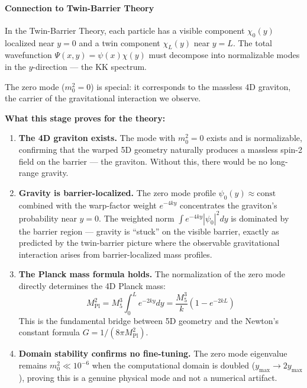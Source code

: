 \documentclass[
  11pt,
]{article}
\begin{document}
\bigskip

\hypertarget{connection-to-twin-barrier-theory-2}{%
\paragraph{Connection to Twin-Barrier
Theory}\label{connection-to-twin-barrier-theory-2}}

In the Twin-Barrier Theory, each particle has a visible component
\(\chi_0(y)\) localized near \(y = 0\) and a twin component
\(\chi_L(y)\) near \(y = L\). The total wavefunction
\(\Psi(x,y) = \psi(x)\chi(y)\) must decompose into normalizable modes in
the \(y\)-direction --- the KK spectrum.

The zero mode (\(m_0^2 = 0\)) is special: it corresponds to the massless
4D graviton, the carrier of the gravitational interaction we observe.

\textbf{What this stage proves for the theory:}

\begin{enumerate}
\def\labelenumi{\arabic{enumi}.}
\item
  \textbf{The 4D graviton exists.} The mode with \(m_0^2 = 0\) exists
  and is normalizable, confirming that the warped 5D geometry naturally
  produces a massless spin-2 field on the barrier --- the graviton.
  Without this, there would be no long-range gravity.
\item
  \textbf{Gravity is barrier-localized.} The zero mode profile
  \(\psi_0(y) \approx \text{const}\) combined with the warp-factor
  weight \(e^{-4ky}\) concentrates the graviton's probability near
  \(y = 0\). The weighted norm \(\int e^{-4ky}|\psi_0|^2 dy\) is
  dominated by the barrier region --- gravity is ``stuck'' on the
  visible barrier, exactly as predicted by the twin-barrier picture
  where the observable gravitational interaction arises from
  barrier-localized mass profiles.
\item
  \textbf{The Planck mass formula holds.} The normalization of the zero
  mode directly determines the 4D Planck mass:
  \[M_\text{Pl}^2 = M_5^3 \int_0^L e^{-2ky} dy = \frac{M_5^3}{k}(1 - e^{-2kL}) \tag{112}\]
  This is the fundamental bridge between 5D geometry and the Newton's
  constant formula \(G = 1/(8\pi M_\text{Pl}^2)\).
\item
  \textbf{Domain stability confirms no fine-tuning.} The zero mode
  eigenvalue remains \(m_0^2 \ll 10^{-6}\) when the computational domain
  is doubled (\(y_\text{max} \to 2y_\text{max}\)), proving this is a
  genuine physical mode and not a numerical artifact.
\end{enumerate}
\end{document}
